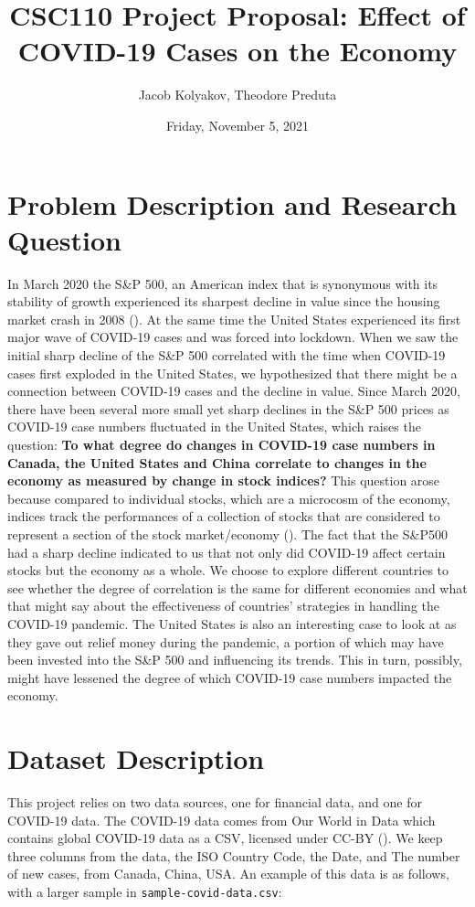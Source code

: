 \documentclass[fontsize=11pt]{article}
\title{CSC110 Project Proposal: Effect of COVID-19 Cases on the Economy}
\author{Jacob Kolyakov, Theodore Preduta}
\date{Friday, November 5, 2021}
\begin{document}
\maketitle

\section*{Problem Description and Research Question}

In March 2020 the S\&P 500, an American index that is synonymous with its stability of growth experienced its sharpest decline in value since the housing market crash in 2008 (\cite{yahoo}).
At the same time the United States experienced its first major wave of COVID-19 cases and was forced into lockdown. 
When we saw the initial sharp decline of the S\&P 500 correlated with the time when COVID-19 cases first exploded in the United States, we hypothesized that there might be a connection between COVID-19 cases and the decline in value.
Since March 2020, there have been several more small yet sharp declines in the S\&P 500 prices as COVID-19 case numbers fluctuated in the United States, which raises the question:
\textbf{To what degree do changes in COVID-19 case numbers in Canada, the United States and China correlate to changes in the economy as measured by change in stock indices?}
This question arose because compared to individual stocks, which are a microcosm of the economy, indices track the performances of a collection of stocks that are considered to represent a section of the stock market/economy (\cite{indexesgov}). 
The fact that the S\&P500 had a sharp decline indicated to us that not only did COVID-19 affect certain stocks but the economy as a whole. 
We choose to explore different countries to see whether the degree of correlation is the same for different economies and what that might say about the effectiveness of countries' strategies in handling the COVID-19 pandemic.
The United States is also an interesting case to look at as they gave out relief money during the pandemic, a portion of which may have been invested into the S\&P 500 and influencing its trends.
This in turn, possibly, might have lessened the degree of which COVID-19 case numbers impacted the economy.

\section*{Dataset Description}

This project relies on two data sources, one for financial data, and one for COVID-19 data.
The COVID-19 data comes from Our World in Data which contains global COVID-19 data as a CSV, licensed under CC-BY (\cite{owidcoronavirus}).
We keep three columns from the data, the ISO Country Code, the Date, and The number of new cases, from Canada, China, USA.
An example of this data is as follows, with a larger sample in \texttt{sample-covid-data.csv}:
\end{document}
